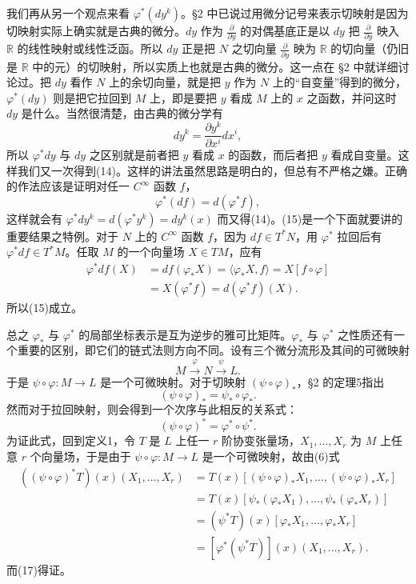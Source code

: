 我们再从另一个观点来看 $\varphi^*(dy^k)$。§2 中已说过用微分记号来表示切映射是因为切映射实际上确实就是古典的微分。$dy$ 作为 $\frac{\partial}{\partial y}$ 的对偶基底正是以 $dy$ 把 $\frac{\partial}{\partial y}$ 映入 $\mathbb R$ 的线性映射或线性泛函。所以 $dy$ 正是把 $N$ 之切向量 $\frac{\partial}{\partial y}$ 映为 $\mathbb R$ 的切向量（仍旧是 $\mathbb R$ 中的元）的切映射，所以实质上也就是古典的微分。这一点在 §2 中就详细讨论过。把 $dy$ 看作 $N$ 上的余切向量，就是把 $y$ 作为 $N$ 上的“自变量”得到的微分，$\varphi^*(dy)$ 则是把它拉回到 $M$ 上，即是要把 $y$ 看成 $M$ 上的 $x$ 之函数，并问这时 $dy$ 是什么。当然很清楚，由古典的微分学有
\[
 dy^k=\frac{\partial y^k}{\partial x^i}dx^i,
\]
所以 $\varphi^*dy$ 与 $dy$ 之区别就是前者把 $y$ 看成 $x$ 的函数，而后者把 $y$ 看成自变量。这样我们又一次得到(14)。这样的讲法虽然思路是明白的，但总有不严格之嫌。正确的作法应该是证明对任一 $C^\infty$ 函数 $f$，
\begin{equation}
 \varphi^*(df)=d(\varphi^*f),
 \tag{15}
\end{equation}
这样就会有 $\varphi^*dy^k=d(\varphi^*y^k)=dy^k(x)$ 而又得(14)。(15)是一个下面就要讲的重要结果之特例。对于 $N$ 上的 $C^\infty$ 函数 $f$，因为 $df\in T^*N$，用 $\varphi^*$ 拉回后有 $\varphi^*df\in T^*M$。任取 $M$ 的一个向量场 $X\in TM$，应有
\begin{align*}
 \varphi^*df(X)&=df(\varphi_*X)=\langle\varphi_*X,f\rangle=X[f\circ\varphi]\\
 &=X(\varphi^*f)=d(\varphi^*f)(X).
\end{align*}
所以(15)成立。

总之 $\varphi_*$ 与 $\varphi^*$ 的局部坐标表示是互为逆步的雅可比矩阵。$\varphi_*$ 与 $\varphi^*$ 之性质还有一个重要的区别，即它们的链式法则方向不同。设有三个微分流形及其间的可微映射
\[
 M\xrightarrow{\varphi}N\xrightarrow{\psi}L.
\]
于是 $\psi\circ\varphi:M\to L$ 是一个可微映射。对于切映射 $(\psi\circ\varphi)_*$，§2 的定理5指出
\begin{equation}
 (\psi\circ\varphi)_*=\psi_*\circ\varphi_*.
 \tag{16}
\end{equation}
然而对于拉回映射，则会得到一个次序与此相反的关系式：
\begin{equation}
 (\psi\circ\varphi)^*=\varphi^*\circ\psi^*.
 \tag{17}
\end{equation}
为证此式，回到定义1，令 $T$ 是 $L$ 上任一 $r$ 阶协变张量场，$X_1,\ldots,X_r$ 为 $M$ 上任意 $r$ 个向量场，于是由于 $\psi\circ\varphi:M\to L$ 是一个可微映射，故由(6)式
\begin{align*}
 ((\psi\circ\varphi)^*T)(x)(X_1,\ldots,X_r)
 &=T(x)[(\psi\circ\varphi)_*X_1,\ldots,(\psi\circ\varphi)_*X_r]\\
 &=T(x)[\psi_*(\varphi_*X_1),\ldots,\psi_*(\varphi_*X_r)]\\
 &=(\psi^*T)(x)[\varphi_*X_1,\ldots,\varphi_*X_r]\\
 &=[\varphi^*(\psi^*T)](x)(X_1,\ldots,X_r).
\end{align*}
而(17)得证。

